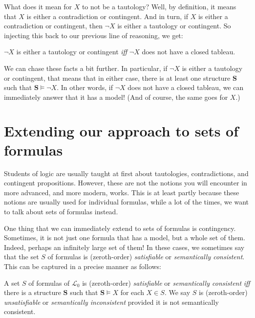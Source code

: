 What does it mean for $X$ to not be a tautology? Well, by definition, it means that $X$ is either a contradiction or contingent. And in turn, if $X$ is either a contradiction or contingent, then $\neg X$ is either a tautology or contingent. So injecting this back to our previous line of reasoning, we get:

\begin{prop}
$\neg X$ is either a tautology or contingent \textit{iff} $\neg X$ does not have a closed tableau. 
\end{prop} 

We can chase these facts a bit further. In particular, if $\neg X$ is either a tautology or contingent, that means that in either case, there is at least one structure $\mathbf{S}$ such that $\mathbf{S} \models \neg X$. In other words, if $\neg X$ does not have a closed tableau, we can immediately answer that it has a model! (And of course, the same goes for $X$.)

\section{Extending our approach to sets of formulas}

Students of logic are usually taught at first about tautologies, contradictions, and contingent propositions. However, these are not the notions you will encounter in more advanced, and more modern, works. This is at least partly because these notions are usually used for individual formulas, while a lot of the times, we want to talk about sets of formulas instead. 

One thing that we can immediately extend to sets of formulas is contingency. Sometimes, it is not just one formula that has a model, but a whole set of them. Indeed, perhaps an infinitely large set of them! In these cases, we sometimes say that the set $S$ of formulas is (zeroth-order) \textit{satisfiable} or \textit{semantically consistent}. This can be captured in a precise manner as follows:

\begin{defn}[Satisfiability]
A set $S$ of formulas of $\mathcal{L}_0$ is (zeroth-order) \textit{satisfiable} or \textit{semantically consistent} \textit{iff} there is a structure $\mathbf{S}$ such that $\mathbf{S} \models X$ for each $X \in S$. We say $S$ is (zeroth-order) \textit{unsatisfiable} or \textit{semantically inconsistent} provided it is not semantically consistent. 
\end{defn}

